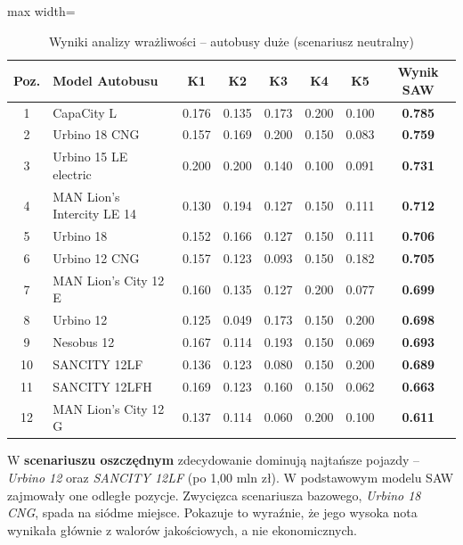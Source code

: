 \begin{table}[H]
    \centering
    \caption{Wyniki analizy wrażliwości -- autobusy duże (scenariusz neutralny)}
    \vspace{0.2cm}
    \begin{adjustbox}{max width=\textwidth}
    \begin{tabular}{|c|l|c|c|c|c|c|c|}
        \hline
        \textbf{Poz.} & \textbf{Model Autobusu} & \textbf{K1} & \textbf{K2} & \textbf{K3} & \textbf{K4} & \textbf{K5} & \textbf{Wynik SAW} \\ \hline
        1 & CapaCity L                 & 0.176 & 0.135 & 0.173 & 0.200 & 0.100 & \textbf{0.785} \\ \hline
        2 & Urbino 18 CNG              & 0.157 & 0.169 & 0.200 & 0.150 & 0.083 & \textbf{0.759} \\ \hline
        3 & Urbino 15 LE electric      & 0.200 & 0.200 & 0.140 & 0.100 & 0.091 & \textbf{0.731} \\ \hline
        4 & MAN Lion's Intercity LE 14 & 0.130 & 0.194 & 0.127 & 0.150 & 0.111 & \textbf{0.712} \\ \hline
        5 & Urbino 18                  & 0.152 & 0.166 & 0.127 & 0.150 & 0.111 & \textbf{0.706} \\ \hline
        6 & Urbino 12 CNG              & 0.157 & 0.123 & 0.093 & 0.150 & 0.182 & \textbf{0.705} \\ \hline
        7 & MAN Lion's City 12 E       & 0.160 & 0.135 & 0.127 & 0.200 & 0.077 & \textbf{0.699} \\ \hline
        8 & Urbino 12                  & 0.125 & 0.049 & 0.173 & 0.150 & 0.200 & \textbf{0.698} \\ \hline
        9 & Nesobus 12                 & 0.167 & 0.114 & 0.193 & 0.150 & 0.069 & \textbf{0.693} \\ \hline
        10 & SANCITY 12LF              & 0.136 & 0.123 & 0.080 & 0.150 & 0.200 & \textbf{0.689} \\ \hline
        11 & SANCITY 12LFH             & 0.169 & 0.123 & 0.160 & 0.150 & 0.062 & \textbf{0.663} \\ \hline
        12 & MAN Lion's City 12 G      & 0.137 & 0.114 & 0.060 & 0.200 & 0.100 & \textbf{0.611} \\ \hline
    \end{tabular}
    \end{adjustbox}
\end{table}

W \textbf{scenariuszu oszczędnym} zdecydowanie dominują najtańsze pojazdy -- \textit{Urbino 12} oraz \textit{SANCITY 12LF} (po 1,00 mln zł). W podstawowym modelu SAW zajmowały one odległe pozycje. Zwycięzca scenariusza bazowego, \textit{Urbino 18 CNG}, spada na siódme miejsce. Pokazuje to wyraźnie, że jego wysoka nota wynikała głównie z walorów jakościowych, a nie ekonomicznych.


